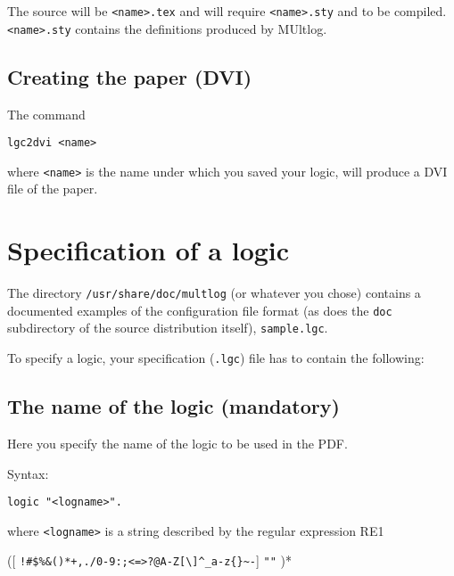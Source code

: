 \documentclass[]{article}
\begin{document}
The source will be \texttt{\textless{}name\textgreater{}.tex} and will
require \texttt{\textless{}name\textgreater{}.sty} and to be compiled.
\texttt{\textless{}name\textgreater{}.sty} contains the definitions
produced by MUltlog.

\hypertarget{creating-the-paper-dvi}{%
\subsection{Creating the paper (DVI)}\label{creating-the-paper-dvi}}

The command

\begin{verbatim}
lgc2dvi <name>
\end{verbatim}

where \texttt{\textless{}name\textgreater{}} is the name under which you
saved your logic, will produce a DVI file of the paper.

\hypertarget{specification-of-a-logic}{%
\section{Specification of a logic}\label{specification-of-a-logic}}

The directory \texttt{/usr/share/doc/multlog} (or whatever you chose)
contains a documented examples of the configuration file format (as does
the \texttt{doc} subdirectory of the source distribution itself),
\texttt{sample.lgc}.

To specify a logic, your specification (\texttt{.lgc}) file has to
contain the following:

\hypertarget{the-name-of-the-logic-mandatory}{%
\subsection{The name of the logic
(mandatory)}\label{the-name-of-the-logic-mandatory}}

Here you specify the name of the logic to be used in the PDF.

Syntax:

\begin{verbatim}
logic "<logname>".
\end{verbatim}

where \texttt{\textless{}logname\textgreater{}} is a string described by
the regular expression RE1

({[}
\texttt{!\#\$\%\&\textquotesingle{}()*+,./0-9:;\textless{}=\textgreater{}?@A-Z{[}\textbackslash{}{]}\^{}\_\textasciigrave{}a-z\{\textbar{}\}\textasciitilde{}-}{]}
\textbar{} \texttt{""} )*
\end{document}
